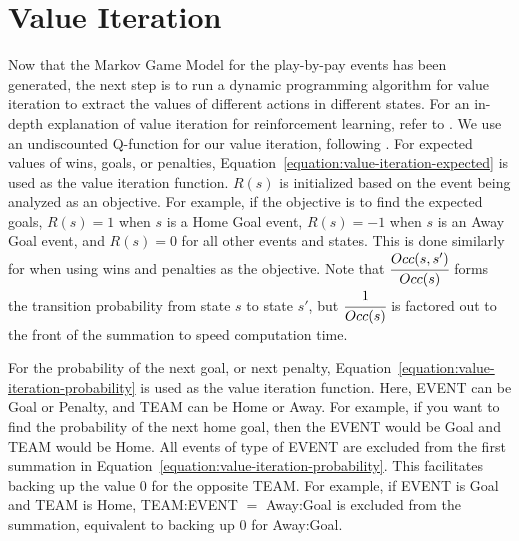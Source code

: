 \documentclass[]{article}
\begin{document}
\begin{table}[htb]
\caption{Size of Markov Decision Process Graph}
\label{table:size-of-mdp}
\begin{center}
\end{center}
\end{table}



\section{Value Iteration}
\label{subsec:value-iteration-alg}

Now that the Markov Game Model for the play-by-pay events has been generated, the next step is to run a dynamic programming algorithm for value iteration to extract the values of different actions in different states. For an in-depth explanation of value iteration for reinforcement learning, refer to \citep{Mitchell1997}. We use an undiscounted Q-function for our value iteration, following \citep{Schwartz1993}. For expected values of wins, goals, or penalties, Equation~\ref{equation:value-iteration-expected} is used as the value iteration function. $R(s)$ is initialized based on the event being analyzed as an objective. For example, if the objective is to find the expected goals, $R(s) = 1$ when $s$ is a Home Goal event, $R(s) = -1$ when $s$ is an Away Goal event, and $R(s) = 0$ for all other events and states. This is done similarly for when using wins and penalties as the objective. Note that $\cfrac{Occ(s,s')}{Occ(s)}$ forms the transition probability from state $s$ to state $s'$, but $\cfrac{1}{Occ(s)}$ is factored out to the front of the summation to speed computation time.

For the probability of the next goal, or next penalty, Equation~\ref{equation:value-iteration-probability} is used as the value iteration function. Here, EVENT can be Goal or Penalty, and TEAM can be Home or Away. For example, if you want to find the probability of the next home goal, then the EVENT would be Goal and TEAM would be Home. All events of type of EVENT are excluded from the first summation in Equation~\ref{equation:value-iteration-probability}. This facilitates backing up the value $0$ for the opposite TEAM. For example, if EVENT is Goal and TEAM is Home, TEAM:EVENT $=$ Away:Goal is excluded from the summation, equivalent to backing up $0$ for Away:Goal.
\end{document}
